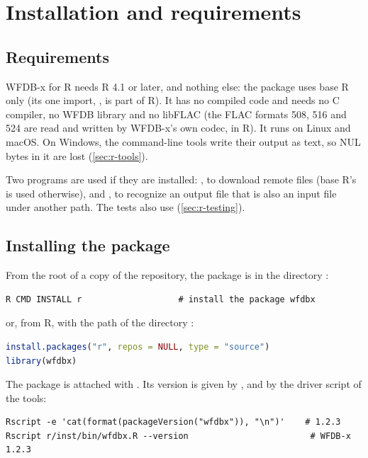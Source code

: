 \section{Installation and requirements}
\label{sec:r-install}

\subsection{Requirements}

WFDB-x for R needs R 4.1 or later, and nothing else: the package uses base R only (its
one import, , is part of R). It has no compiled code and needs no C compiler,
no WFDB library and no libFLAC (the FLAC formats 508, 516 and 524 are read and written by
WFDB-x's own codec, in R). It runs on Linux and macOS. On Windows, the command-line tools
write their output as text, so NUL bytes in it are lost (\cref{sec:r-tools}).

Two programs are used if they are installed: , to download remote files (base
R's  is used otherwise), and , to recognize an output file that is
also an input file under another path. The tests also use 
(\cref{sec:r-testing}).

\subsection{Installing the package}

From the root of a copy of the repository, the package is in the directory :

\begin{lstlisting}[style=shell]
R CMD INSTALL r                   # install the package wfdbx
\end{lstlisting}

or, from R, with the path of the directory :

\begin{lstlisting}[language=R]
install.packages("r", repos = NULL, type = "source")
library(wfdbx)
\end{lstlisting}

The package is attached with . Its version is given by
, and by the driver script of the tools:

\begin{lstlisting}[style=shell]
Rscript -e 'cat(format(packageVersion("wfdbx")), "\n")'    # 1.2.3
Rscript r/inst/bin/wfdbx.R --version                        # WFDB-x 1.2.3
\end{lstlisting}

